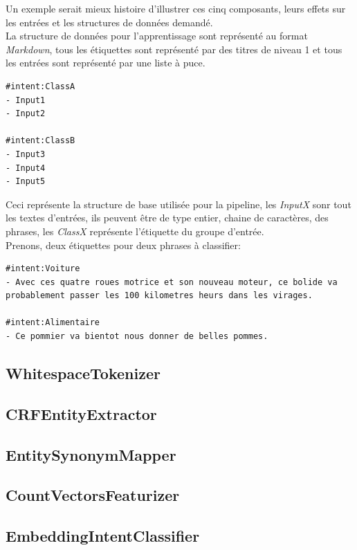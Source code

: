 \pagebreak

Un exemple serait mieux histoire d'illustrer ces cinq composants, leurs effets sur les entrées et les structures de données demandé.\\
La structure de données pour l'apprentissage sont représenté au format \textit{Markdown}, tous les étiquettes sont représenté par des titres de niveau 1 et tous les entrées sont représenté par une liste à puce.\\

\begin{lstlisting}
#intent:ClassA
- Input1
- Input2

#intent:ClassB
- Input3
- Input4
- Input5
\end{lstlisting}

Ceci représente la structure de base utilisée pour la pipeline, les \textit{InputX} sonr tout les textes d'entrées, ils peuvent être de type entier, chaine de caractères, des phrases, les \textit{ClassX} représente l'étiquette du groupe d'entrée.\\
Prenons, deux étiquettes pour deux phrases à classifier:\\

\begin{lstlisting}
#intent:Voiture
- Avec ces quatre roues motrice et son nouveau moteur, ce bolide va probablement passer les 100 kilometres heurs dans les virages.

#intent:Alimentaire
- Ce pommier va bientot nous donner de belles pommes.
\end{lstlisting}

\subsection{WhitespaceTokenizer}
\subsection{CRFEntityExtractor}
\subsection{EntitySynonymMapper}
\subsection{CountVectorsFeaturizer}
\subsection{EmbeddingIntentClassifier}

